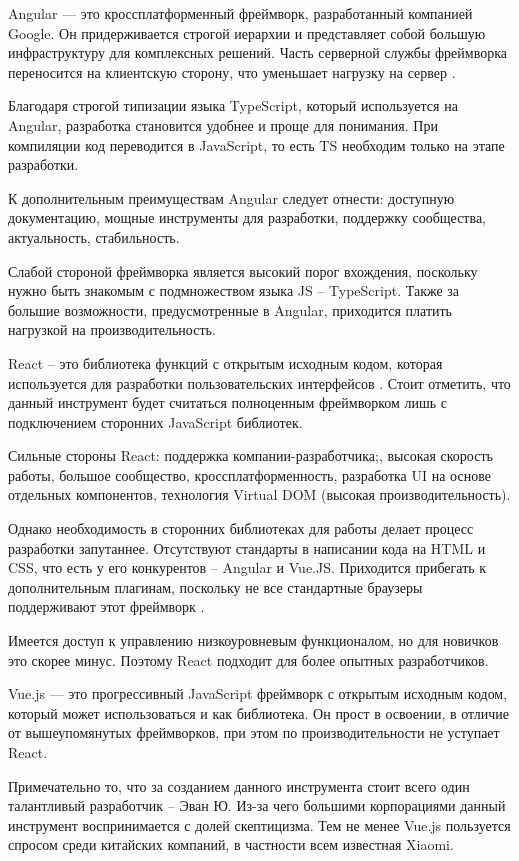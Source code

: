 Angular — это кроссплатформенный фреймворк, разработанный компанией Google.
Он придерживается строгой иерархии и представляет собой большую инфраструктуру для комплексных решений.
Часть серверной службы фреймворка переносится на клиентскую сторону, что уменьшает нагрузку на сервер \cite{sergacheva-framework-1}.

Благодаря строгой типизации языка TypeScript, который используется на Angular, разработка
становится удобнее и проще для понимания.
При компиляции код переводится в JavaScript, то есть TS необходим только на этапе разработки.

К дополнительным преимуществам Angular следует отнести: доступную документацию, мощные инструменты для разработки, поддержку сообщества, актуальность, стабильность.

Слабой стороной фреймворка является высокий порог вхождения, поскольку нужно быть знакомым с подмножеством языка JS – TypeScript.
Также за большие возможности, предусмотренные в Angular, приходится платить нагрузкой на
производительность.

React – это библиотека функций с открытым исходным кодом, которая используется для разработки пользовательских интерфейсов \cite{sergacheva-framework-2}.
Стоит отметить, что данный инструмент будет считаться полноценным фреймворком лишь с подключением сторонних JavaScript библиотек.

Сильные стороны React: поддержка компании-разработчика;, высокая скорость работы, большое сообщество, кроссплатформенность, разработка UI на основе отдельных компонентов, технология Virtual DOM (высокая производительность).

Однако необходимость в сторонних библиотеках для работы делает процесс разработки запутаннее.
Отсутствуют стандарты в написании кода на HTML и CSS, что есть у его конкурентов – Angular и Vue.JS.
Приходится прибегать к дополнительным плагинам, поскольку не все стандартные браузеры поддерживают этот фреймворк \cite{sergacheva-framework-3}.

Имеется доступ к управлению низкоуровневым функционалом, но для новичков это скорее минус.
Поэтому React подходит для более опытных разработчиков.

Vue.js — это прогрессивный JavaScript фреймворк с открытым исходным кодом, который может использоваться и как библиотека.
Он прост в освоении, в отличие от вышеупомянутых фреймворков, при этом по производительности не уступает React.

Примечательно то, что за созданием данного инструмента стоит всего один талантливый разработчик – Эван Ю.
Из-за чего большими корпорациями данный инструмент воспринимается с долей скептицизма.
Тем не менее Vue.js пользуется спросом среди китайских компаний, в частности всем известная Xiaomi.

